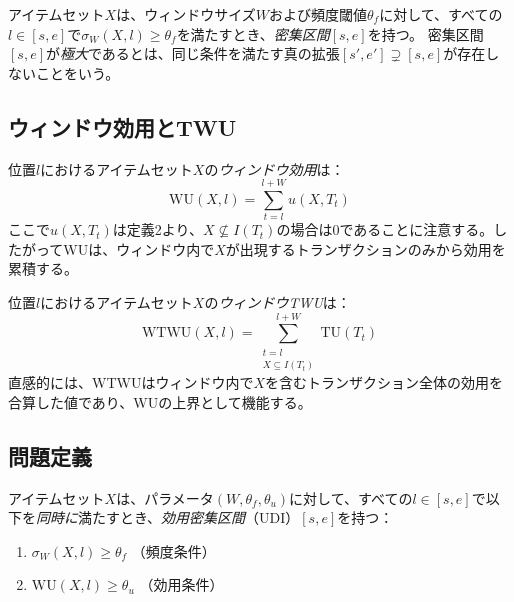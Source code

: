 \begin{definition}[密集区間]
アイテムセット$X$は、ウィンドウサイズ$W$および頻度閾値$\theta_f$に対して、すべての$l \in [s, e]$で$\sigma_W(X, l) \geq \theta_f$を満たすとき、\emph{密集区間}$[s, e]$を持つ。
密集区間$[s, e]$が\emph{極大}であるとは、同じ条件を満たす真の拡張$[s', e'] \supsetneq [s, e]$が存在しないことをいう。
\end{definition}

\subsection{ウィンドウ効用とTWU}

\begin{definition}[ウィンドウ効用]
\label{def:wu}
位置$l$におけるアイテムセット$X$の\emph{ウィンドウ効用}は：
\begin{equation}
    \text{WU}(X, l) = \sum_{t=l}^{l+W} u(X, T_t)
\end{equation}
ここで$u(X, T_t)$は定義2より、$X \not\subseteq I(T_t)$の場合は0であることに注意する。したがってWUは、ウィンドウ内で$X$が出現するトランザクションのみから効用を累積する。
\end{definition}

\begin{definition}[ウィンドウトランザクション加重利用度]
\label{def:wtwu}
位置$l$におけるアイテムセット$X$の\emph{ウィンドウTWU}は：
\begin{equation}
    \text{WTWU}(X, l) = \sum_{\substack{t=l \\ X \subseteq I(T_t)}}^{l+W} \text{TU}(T_t)
\end{equation}
直感的には、WTWUはウィンドウ内で$X$を含むトランザクション全体の効用を合算した値であり、WUの上界として機能する。
\end{definition}

\subsection{問題定義}

\begin{definition}[効用密集区間]
\label{def:udi}
アイテムセット$X$は、パラメータ$(W, \theta_f, \theta_u)$に対して、すべての$l \in [s, e]$で以下を\emph{同時に}満たすとき、\emph{効用密集区間}（UDI）$[s, e]$を持つ：
\begin{enumerate}
    \item $\sigma_W(X, l) \geq \theta_f$ \quad （頻度条件）
    \item $\text{WU}(X, l) \geq \theta_u$ \quad （効用条件）
\end{enumerate}
\end{definition}


